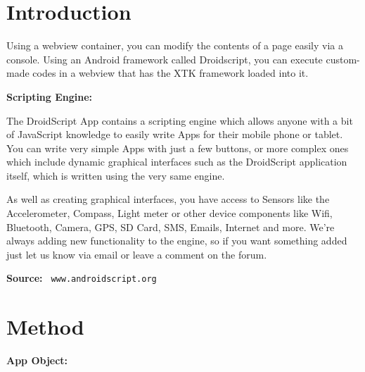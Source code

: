 \documentclass[sigconf]{acmart}
\begin{document}
\maketitle
\newpage
\section{Introduction}
Using a webview container, you can modify the contents of a page easily via a console. Using an Android framework called Droidscript, you can execute custom-made codes in a webview that has the XTK framework loaded into it.



\vspace{0.09 cm}
\textbf{Scripting Engine:}

The DroidScript App contains a scripting engine which allows anyone with a bit of JavaScript knowledge to easily write Apps for their mobile phone or tablet. You can write very simple Apps with just a few buttons, or more complex ones which include dynamic graphical interfaces such as the DroidScript application itself, which is written using the very same engine.

As well as creating graphical interfaces, you have access to Sensors like the Accelerometer, Compass, Light meter or other device components like Wifi, Bluetooth, Camera, GPS, SD Card, SMS, Emails, Internet and more. We're always adding new functionality to the engine, so if you want something added just let us know via email or leave a comment on the forum.

\textbf{Source: } \nolinkurl{ www.androidscript.org}\newline
\vspace{0.045 cm}

\section{Method}

\textbf{App Object:}
\end{document}
